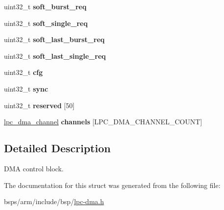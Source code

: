 \begin{DoxyCompactItemize}
uint32\+\_\+t {\bfseries soft\+\_\+burst\+\_\+req}
\item 
\mbox{\label{structlpc__dma_a4e3bb009b06143afd55a8fab9af33e43}} 
uint32\+\_\+t {\bfseries soft\+\_\+single\+\_\+req}
\item 
\mbox{\label{structlpc__dma_a8ad2fba2859d80bf86c755d95da3f176}} 
uint32\+\_\+t {\bfseries soft\+\_\+last\+\_\+burst\+\_\+req}
\item 
\mbox{\label{structlpc__dma_a3ac134fc16cb15d3281f6c68c2085e2a}} 
uint32\+\_\+t {\bfseries soft\+\_\+last\+\_\+single\+\_\+req}
\item 
\mbox{\label{structlpc__dma_a65050c10a9412c18e493fa69c130dc7b}} 
uint32\+\_\+t {\bfseries cfg}
\item 
\mbox{\label{structlpc__dma_acf3d9a9d2fe4bec80524353ae115d412}} 
uint32\+\_\+t {\bfseries sync}
\item 
\mbox{\label{structlpc__dma_a48fd205027cf5dbbf42cc29ecbf4c8b8}} 
uint32\+\_\+t {\bfseries reserved} \mbox{[}50\mbox{]}
\item 
\mbox{\label{structlpc__dma_a9c73b2c809122f552380814298ca1394}} 
\mbox{\hyperlink{structlpc__dma__channel}{lpc\+\_\+dma\+\_\+channel}} {\bfseries channels} \mbox{[}L\+P\+C\+\_\+\+D\+M\+A\+\_\+\+C\+H\+A\+N\+N\+E\+L\+\_\+\+C\+O\+U\+NT\mbox{]}
\end{DoxyCompactItemize}


\subsection{Detailed Description}
D\+MA control block. 

The documentation for this struct was generated from the following file\+:\begin{DoxyCompactItemize}
\item 
bsps/arm/include/bsp/\mbox{\hyperlink{lpc-dma_8h}{lpc-\/dma.\+h}}\end{DoxyCompactItemize}
